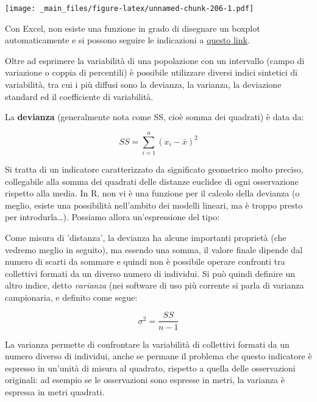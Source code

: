 \documentclass[a4paper,12pt,oneside]{book}
\newenvironment{Shaded}{\begin{snugshade}}{\end{snugshade}}
\newcommand{\KeywordTok}[1]{\textcolor[rgb]{0.13,0.29,0.53}{\textbf{#1}}}
\newcommand{\DecValTok}[1]{\textcolor[rgb]{0.00,0.00,0.81}{#1}}
\newcommand{\StringTok}[1]{\textcolor[rgb]{0.31,0.60,0.02}{#1}}
\newcommand{\OperatorTok}[1]{\textcolor[rgb]{0.81,0.36,0.00}{\textbf{#1}}}
\newcommand{\NormalTok}[1]{#1}
\theoremstyle{definition}
\theoremstyle{definition}
\theoremstyle{definition}
\theoremstyle{remark}
\begin{document}
\texttt{[image: \_main\_files/figure-latex/unnamed-chunk-206-1.pdf]}

Con Excel, non esiste una funzione in grado di disegnare un boxplot
automaticamente e si possono seguire le indicazioni a
\href{http://www.dummies.com/how-to/content/boxandwhisker-charts-for-excel.html}{questo
link}.

Oltre ad esprimere la variabilità di una popolazione con un intervallo
(campo di variazione o coppia di percentili) è possibile utilizzare
diversi indici sintetici di variabilità, tra cui i più diffusi sono la
devianza, la varianza, la deviazione standard ed il coefficiente di
variabilità.

La \textbf{devianza} (generalmente nota come SS, cioè somma dei
quadrati) è data da:

\[SS = \sum\limits_{i = 1}^n {(x_i  - \bar x)^2 }\]

Si tratta di un indicatore caratterizzato da significato geometrico
molto preciso, collegabile alla somma dei quadrati delle distanze
euclidee di ogni osservazione rispetto alla media. In R, non vi è una
funzione per il calcolo della devianza (o meglio, esiste una possibilità
nell'ambito dei modelli lineari, ma è troppo presto per
introdurla\ldots{}). Possiamo allora un'espressione del tipo:

\begin{Shaded}
\end{Shaded}

Come misura di 'distanza', la devianza ha alcune importanti proprietà
(che vedremo meglio in seguito), ma essendo una somma, il valore finale
dipende dal numero di scarti da sommare e quindi non è possibile operare
confronti tra collettivi formati da un diverso numero di individui. Si
può quindi definire un altro indice, detto \emph{varianza} (nei software
di uso più corrente si parla di varianza campionaria, e definito come
segue:

\[\sigma^2  = \frac{SS}{n - 1}\]

La varianza permette di confrontare la variabilità di collettivi formati
da un numero diverso di individui, anche se permane il problema che
questo indicatore è espresso in un'unità di misura al quadrato, rispetto
a quella delle osservazioni originali: ad esempio se le osservazioni
sono espresse in metri, la varianza è espressa in metri quadrati.
\end{document}

